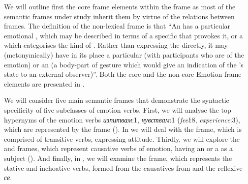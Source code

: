 \documentclass[output=paper,colorlinks,citecolor=brown]{langscibook}
\begin{document}
We will outline first the core frame elements within the  frame as most of the semantic frames under study inherit them by virtue of the relations between frames. The definition of the  non-lexical frame is that ``An  has a particular emotional , which may be described in terms of a specific  that provokes it, or a  which categorises the kind of . Rather than expressing the  directly, it may (metonymically) have in its place a particular  (with participants who are  of the emotion) or an  (a body-part of gesture which would give an indication of the 's state to an external observer)''. Both the core and the non-core Emotion frame elements are presented in .
 

We will consider five main semantic frames that demonstrate the syntactic specificity of five subclasses of emotion verbs. First, we will analyse the top hy\-pernyms of the emotion verbs  {\textit{изпитвам}:1, \textit{чувствам}:1} ({\textit{feel}:8, \textit{experience}:3}), which are represented by the  frame  (). In  we will deal with the  frame, which is comprised of transitive verbs, expressing attitude. Thirdly, we will explore the  and  frames, which represent causative verbs of emotion, having  an  or a  as a subject (). And finally, in , we will examine the  frame, which represents the stative and inchoative verbs, formed from the causatives from  and the reflexive \textit{се}.
\end{document}
